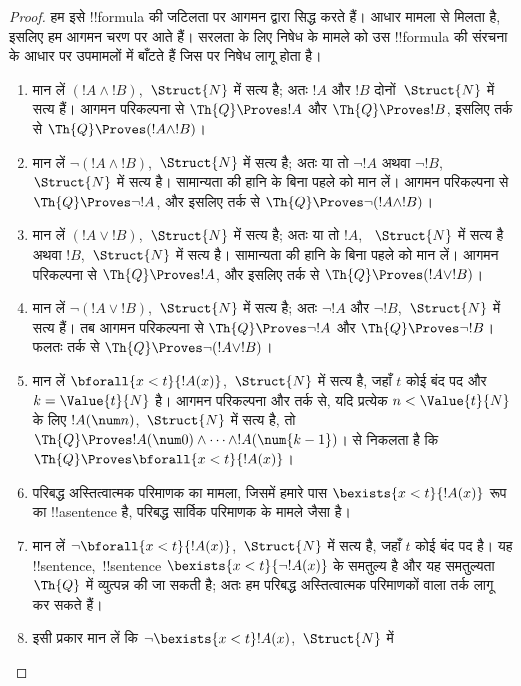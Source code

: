 \documentclass[../../../include/open-logic-section]{subfiles}
\begin{document}
\begin{proof}
हम इसे !!{formula} की जटिलता पर आगमन द्वारा सिद्ध करते हैं।
%
आधार मामला  से मिलता है, इसलिए हम आगमन चरण
पर आते हैं। सरलता के लिए निषेध के मामले को उस !!{formula} की संरचना के
आधार पर उपमामलों में बाँटते हैं जिस पर निषेध लागू होता है।

\begin{enumerate}
\item मान लें $(!A \land !B)$,~$\Struct{N}$ में सत्य है; अतः $!A$ और $!B$
दोनों~$\Struct{N}$ में सत्य हैं। आगमन परिकल्पना से
$\Th{Q} \Proves !A$ और $\Th{Q} \Proves !B$, इसलिए तर्क से
$\Th{Q} \Proves (!A \land !B)$।
%
\item मान लें $\lnot (!A \land !B)$,~$\Struct{N}$ में सत्य है; अतः या तो
$\lnot !A$ अथवा $\lnot !B$,~$\Struct{N}$ में सत्य है। सामान्यता की हानि
के बिना पहले को मान लें। आगमन परिकल्पना से
$\Th{Q} \Proves \lnot !A$, और इसलिए तर्क से
$\Th{Q} \Proves \lnot (!A \land !B)$।
%
\item मान लें $(!A \lor !B)$,~$\Struct{N}$ में सत्य है; अतः या तो $!A$,
~$\Struct{N}$ में सत्य है अथवा $!B$,~$\Struct{N}$ में सत्य है। सामान्यता की हानि के बिना पहले को
मान लें। आगमन परिकल्पना से $\Th{Q} \Proves !A$, और इसलिए तर्क से
$\Th{Q} \Proves (!A \lor !B)$।
%
\item मान लें $\lnot(!A \lor !B)$,~$\Struct{N}$ में सत्य है; अतः
$\lnot !A$ और $\lnot !B$,~$\Struct{N}$ में सत्य हैं। तब आगमन परिकल्पना से
$\Th{Q} \Proves \lnot !A$ और $\Th{Q} \Proves \lnot !B$। फलतः तर्क से
$\Th{Q} \Proves \lnot(!A \lor !B)$।
%
\item मान लें $\bforall{x<t}{!A(x)}$,~$\Struct{N}$ में सत्य है, जहाँ $t$
कोई बंद पद और $k=\Value{t}{N}$ है। आगमन परिकल्पना और तर्क से, यदि प्रत्येक
$n < \Value{t}{N}$ के लिए $!A(\num n)$,~$\Struct{N}$ में सत्य है, तो
$\Th{Q} \Proves !A(\num 0) \land \dots \land !A(\num{k-1})$।
 से निकलता है कि
$\Th{Q} \Proves \bforall{x<t}{!A(x)}$।
%
\item परिबद्ध अस्तित्वात्मक परिमाणक का मामला, जिसमें हमारे पास
$\bexists{x < t}{!A(x)}$ रूप का !!a{sentence} है, परिबद्ध सार्विक परिमाणक
के मामले जैसा है।
%
\item मान लें $\lnot \bforall{x<t}{!A(x)}$,~$\Struct{N}$ में सत्य है,
जहाँ $t$ कोई बंद पद है। यह !!{sentence},~!!{sentence} $\bexists{x<t}{\lnot !A(x)}$ के
समतुल्य है और यह समतुल्यता~$\Th{Q}$ में व्युत्पन्न की जा सकती है; अतः हम
परिबद्ध अस्तित्वात्मक परिमाणकों वाला तर्क लागू कर सकते हैं।
%
\item इसी प्रकार मान लें कि $\lnot \bexists{x<t}!A(x)$,~$\Struct{N}$ में

\end{enumerate}
\end{proof}
\end{document}
